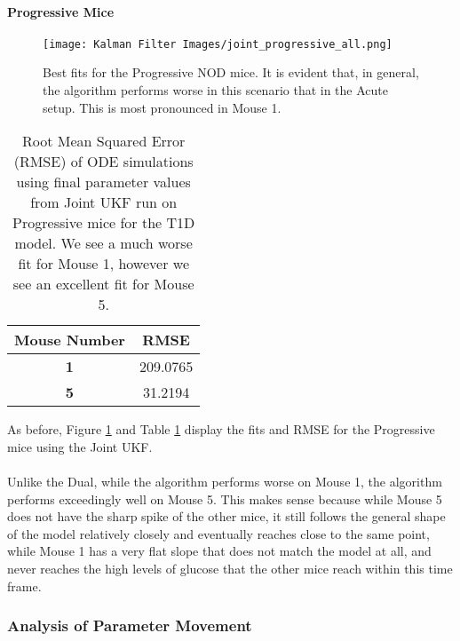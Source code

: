\documentclass{article}
\begin{document}
\paragraph{Progressive Mice}

\begin{figure}[H]
    \centering
    \texttt{[image: Kalman Filter Images/joint\_progressive\_all.png]}
    \caption{Best fits for the Progressive NOD mice. It is evident that, in general, the algorithm performs worse in this scenario that in the Acute setup. This is most pronounced in Mouse 1.}
    \label{fig:T1D_Joint_Progressive_Plots}
\end{figure}

\begin{table}[H]
  \begin{center}
    \label{tab:table1}
    \begin{tabular}{c|c} %
      \textbf{Mouse Number} & \textbf{RMSE} \\
      \hline
      \textbf{1} & 209.0765\\
      \textbf{5} & 31.2194
    \end{tabular}
    \caption{Root Mean Squared Error (RMSE) of ODE simulations using final parameter values from Joint UKF run on Progressive mice for the T1D model. We see a much worse fit for Mouse 1, however we see an excellent fit for Mouse 5.}
    \label{table:T1D_Joint_Progressive_RMSE}
  \end{center}
\end{table}

As before, Figure \ref{fig:T1D_Joint_Progressive_Plots} and Table \ref{table:T1D_Joint_Progressive_RMSE} display the fits and RMSE for the Progressive mice using the Joint UKF.\\
\\

Unlike the Dual, while the algorithm performs worse on Mouse 1, the algorithm performs exceedingly well on Mouse 5. This makes sense because while Mouse 5 does not have the sharp spike of the other mice, it still follows the general shape of the model relatively closely  and eventually reaches close to the same point, while Mouse 1 has a very flat slope that does not match the model at all, and never reaches the high levels of glucose that the other mice reach within this time frame. 

\subsubsection{Analysis of Parameter Movement}
\end{document}
